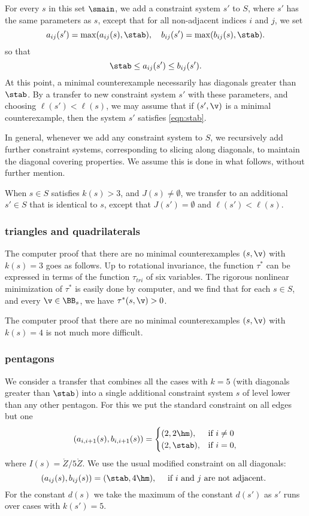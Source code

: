 For every $s$ in this set $\smain$, we add a constraint system $s'$ to $S$,
where $s'$ has the same parameters as $s$, except that for all
non-adjacent indices $i$ and $j$, we set
\begin{equation}\label{eqn:s'}
a_{ij}(s') = \max(a_{ij}(s),\stab),\quad b_{ij}(s')=\max(b_{ij}(s),\stab).
\end{equation}
so that
\begin{equation}\label{eqn:stab}
\stab \le a_{ij}(s')\le b_{ij}(s').
\end{equation}
At this point, a minimal counterexample necessarily has diagonals
greater than $\stab$.  By a transfer to new constraint system $s'$ with
these parameters, and choosing $\ell(s')<\ell(s)$, we may
assume that if $(s',\v)$ is a minimal counterexample, then the system
$s'$ satisfies \eqref{eqn:stab}.

In general, whenever we add any constraint system to $S$, we recursively add
further constraint systems, corresponding to slicing along diagonals,
to maintain the diagonal covering properties.  We assume this is done
in what follows, without further mention.

When $s\in S$ satisfies $k(s)>3$, and $J(s)\ne\emptyset$, we transfer
to an additional $s'\in S$ that is identical to $s$, except that $J(s')=\emptyset$
and $\ell(s')<\ell(s)$.  



\subsubsection{triangles and quadrilaterals}

The computer proof that there are no minimal counterexamples $(s,\v)$
with $k(s)=3$ goes as follows.  Up to rotational invariance, the function
$\tau^*$ can be expressed in terms of the function $\tau_{tri}$ of six
variables.  The rigorous nonlinear minimization of $\tau^*$ is easily done
by computer, and we find that for each $s\in S$, and every $\v\in \BB_s$,
we have $\tau^*(s,\v)>0$.

The computer proof that there are no minimal counterexamples $(s,\v)$
with $k(s)=4$ is not much more difficult.

\subsubsection{pentagons}

We consider a transfer that combines all the cases with $k=5$ (with
diagonals greater than $\stab$) into a single additional constraint
system $s$ of level lower than any other pentagon.  For this we put
the standard constraint on all edges but one
\[
(a_{i,i+1}(s),b_{i,i+1}(s))=
\begin{cases}
(2,2\hm),&\text{if } i\ne 0\\
(2,\stab),&\text{if } i=0,
\end{cases}
\]
where $I(s) = \ring{Z}/5\ring{Z}$.
We use the usual modified constraint on all diagonals:
\[
(a_{ij}(s),b_{ij}(s))=(\stab,4\hm),\quad \text{ if $i$ and $j$ are not adjacent. }
\]
For the constant $d(s)$ we take  the maximum of
the constant $d(s')$ as $s'$ runs over cases with $k(s')=5$.

